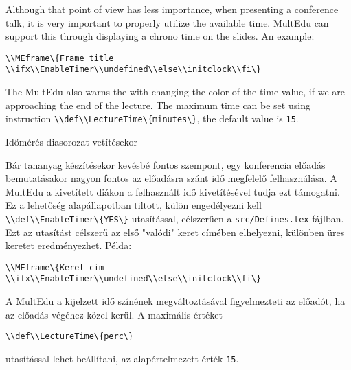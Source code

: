 {
Although that point of view has less importance, when presenting a conference talk,
it is very important to properly utilize the available time.
\gls{MultEdu} can support this through displaying a chrono time on the slides. An example:

\lstinline|\\MEframe\{Frame title \\ifx\\EnableTimer\\undefined\\else\\initclock\\fi\}|

The \gls{MultEdu} also warns the with changing the color of the time value,
if we are approaching the end of the lecture.
The maximum time can be set using instruction \lstinline|\\def\\LectureTime\{minutes\}|,
the default value is \lstinline|15|.
}
{Időmérés diasorozat vetítésekor}
{
Bár tananyag készítésekor kevésbé fontos szempont, egy konferencia előadás bemutatásakor
nagyon fontos az előadásra szánt idő megfelelő felhasználása.
A \gls{MultEdu} a kivetített diákon a felhasznált idő  kivetítésével tudja ezt támogatni.
Ez a lehetőség alapállapotban tiltott, külön engedélyezni kell \lstinline|\\def\\EnableTimer\{YES\}| utasítással,
célszerűen a \lstinline|src/Defines.tex| fájlban.
Ezt az utasítást célszerű az első "valódi" keret címében elhelyezni, különben üres keretet eredményezhet.
Példa:

\lstinline|\\MEframe\{Keret cim \\ifx\\EnableTimer\\undefined\\else\\initclock\\fi\}|

A \gls{MultEdu} a kijelzett idő színének megváltoztásával figyelmezteti az előadót, ha az előadás végéhez közel kerül. A maximális értéket

\lstinline|\\def\\LectureTime\{perc\}|

utasítással 
lehet beállítani, az alapértelmezett érték \lstinline|15|.
}


